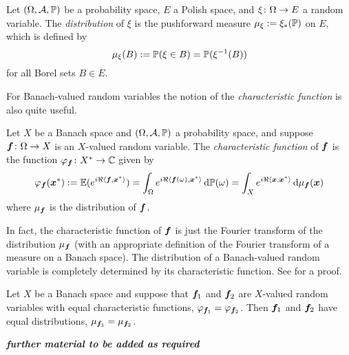 \begin{defn}
  Let $(\Omega,\mc{A},\P)$ be a probability space, $E$ a Polish space, and $\map{\xi}{\Omega}{E}$ a random variable.
  The \emph{distribution} of $\xi$ is the pushforward measure $\mu_{\xi} := \xi_{*}(\P)$ on $E$, which is defined by
  \begin{equation*}
    \mu_{\xi}(B) := \P(\xi \in B) = \P(\xi^{-1}(B))
  \end{equation*}
  for all Borel sets $B \in E$.
\end{defn}

For Banach-valued random variables the notion of the \emph{characteristic function} is also quite useful.

\begin{defn}
  Let $X$ be a Banach space and $(\Omega,\mc{A},\P)$ a probability space, and suppose $\map{\mb{f}}{\Omega}{X}$ is an $X$-valued random variable.
  The \emph{characteristic function} of $\mb{f}$ is the function $\map{\phi_{\mb{f}}}{X^{*}}{\C}$ given by
  \begin{equation*}
    \phi_{\mb{f}}(\mb{x}^{*}) := \E(e^{i\Re\langle \mb{f}, \mb{x}^{*} \rangle}) = \int_{\Omega} e^{i\Re\langle\mb{f}(\omega), \mb{x}^{*} \rangle} \, \dd\P(\omega) = \int_{X} e^{i\Re \langle\mb{x}, \mb{x}^{*} \rangle} \, \dd\mu_{\mb{f}}(\mb{x})
  \end{equation*}
  where $\mu_{\mb{f}}$ is the distribution of $\mb{f}$.
\end{defn}

In fact, the characteristic function of $\mb{f}$ is just the Fourier transform of the distribution $\mu_{\mb{f}}$ (with an appropriate definition of the Fourier transform of a measure on a Banach space).
The distribution of a Banach-valued random variable is completely determined by its characteristic function. See \cite[Corollary E.1.17]{HNVW17} for a proof.

\begin{thm}\label{thm:characteristic-function-uniqueness}
  Let $X$ be a Banach space and suppose that $\mb{f}_{1}$ and $\mb{f}_{2}$ are $X$-valued random variables with equal characteristic functions, $\phi_{\mb{f}_{1}} = \phi_{\mb{f}_{2}}$.
  Then $\mb{f}_{1}$ and $\mb{f}_{2}$ have equal distributions, $\mu_{\mb{f}_{1}} = \mu_{\mb{f}_{2}}$.
\end{thm}

\emph{\textbf{further material to be added as required}}





